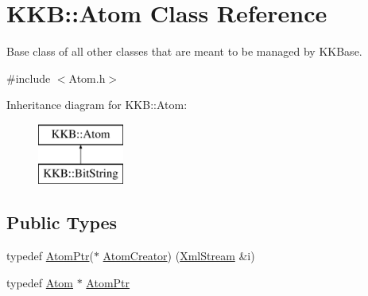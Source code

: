 \hypertarget{class_k_k_b_1_1_atom}{}\section{K\+KB\+:\+:Atom Class Reference}
\label{class_k_k_b_1_1_atom}


Base class of all other classes that are meant to be managed by \textquotesingle{}K\+K\+Base\textquotesingle{}.  




{\ttfamily \#include $<$Atom.\+h$>$}

Inheritance diagram for K\+KB\+:\+:Atom\+:\begin{figure}[H]
\begin{center}
\leavevmode
\includegraphics[height=2.000000cm]{class_k_k_b_1_1_atom}
\end{center}
\end{figure}
\subsection*{Public Types}
\begin{DoxyCompactItemize}
\item 
typedef \hyperlink{class_k_k_b_1_1_atom_a78490bd87df63b6eafa9496104c49238}{Atom\+Ptr}($\ast$ \hyperlink{class_k_k_b_1_1_atom_a9024951751f5b4f98ec92e6ea076c9c4}{Atom\+Creator}) (\hyperlink{class_k_k_b_1_1_xml_stream}{Xml\+Stream} \&i)
\item 
typedef \hyperlink{class_k_k_b_1_1_atom}{Atom} $\ast$ \hyperlink{class_k_k_b_1_1_atom_a78490bd87df63b6eafa9496104c49238}{Atom\+Ptr}
\end{DoxyCompactItemize}
